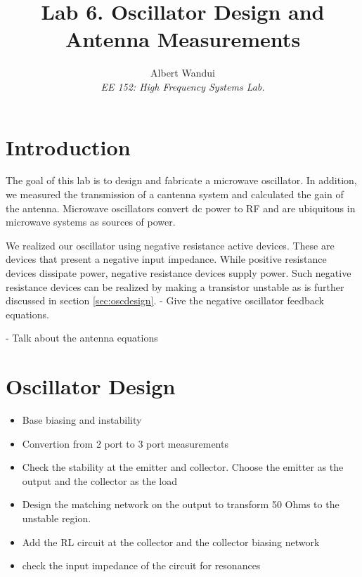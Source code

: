 \documentclass{article}
\begin{document}
\title{Lab 6. Oscillator Design and Antenna Measurements }
\author{Albert Wandui \\
\textit{EE 152: High Frequency Systems Lab.}}
\maketitle


\section*{Introduction}\label{sec:introduction}
The goal of this lab is to design and fabricate a microwave oscillator. In addition, we measured the transmission of a cantenna system and calculated the gain of the antenna. Microwave oscillators convert dc power to RF and are ubiquitous in microwave systems as sources of power. 

We realized our oscillator using negative resistance active devices. These are devices that present a negative input impedance. While positive resistance devices dissipate power, negative resistance devices supply power. Such negative resistance devices can be realized by making a transistor unstable as is further discussed in section \ref{sec:oscdesign}.
 - Give the negative oscillator feedback equations.

 - Talk about the antenna equations
\section*{Oscillator Design}\label{sec:oscdesign}
\begin{itemize}
    \item Base biasing and instability

    \item Convertion from 2 port to 3 port measurements

    \item Check the stability at the emitter and collector. Choose the emitter as the output and the collector as the load

    \item Design the matching network on the output to transform 50 Ohms to the unstable region.

    \item Add the RL circuit at the collector and the collector biasing network

    \item check the input impedance of the circuit for resonances
\end{itemize}
\end{document}

